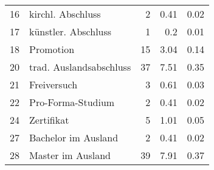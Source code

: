 \begin{longtable}{lXrrr}
        16 & \multicolumn{1}{X}{kirchl. Abschluss} & %
          \num{2} &
          \num[round-mode=places,round-precision=2]{0.41} &
          \num[round-mode=places,round-precision=2]{0.02} \\

        17 & \multicolumn{1}{X}{künstler. Abschluss} & %
          \num{1} &
          \num[round-mode=places,round-precision=2]{0.2} &
          \num[round-mode=places,round-precision=2]{0.01} \\

        18 & \multicolumn{1}{X}{Promotion} & %
          \num{15} &
          \num[round-mode=places,round-precision=2]{3.04} &
          \num[round-mode=places,round-precision=2]{0.14} \\

        20 & \multicolumn{1}{X}{trad. Auslandsabschluss} & %
          \num{37} &
          \num[round-mode=places,round-precision=2]{7.51} &
          \num[round-mode=places,round-precision=2]{0.35} \\

        21 & \multicolumn{1}{X}{Freiversuch} & %
          \num{3} &
          \num[round-mode=places,round-precision=2]{0.61} &
          \num[round-mode=places,round-precision=2]{0.03} \\

        22 & \multicolumn{1}{X}{Pro-Forma-Studium} & %
          \num{2} &
          \num[round-mode=places,round-precision=2]{0.41} &
          \num[round-mode=places,round-precision=2]{0.02} \\

        24 & \multicolumn{1}{X}{Zertifikat} & %
          \num{5} &
          \num[round-mode=places,round-precision=2]{1.01} &
          \num[round-mode=places,round-precision=2]{0.05} \\

        27 & \multicolumn{1}{X}{Bachelor im Ausland} & %
          \num{2} &
          \num[round-mode=places,round-precision=2]{0.41} &
          \num[round-mode=places,round-precision=2]{0.02} \\

        28 & \multicolumn{1}{X}{Master im Ausland} & %
          \num{39} &
          \num[round-mode=places,round-precision=2]{7.91} &
          \num[round-mode=places,round-precision=2]{0.37} \\


\end{longtable}

